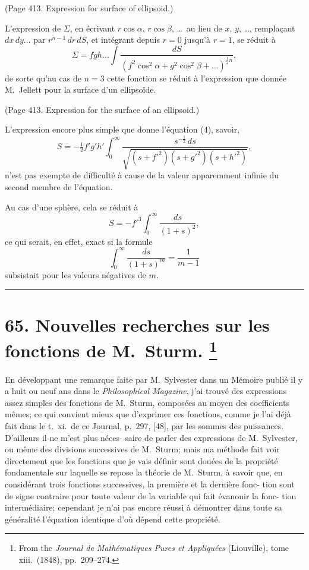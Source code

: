 \documentclass[11pt,a4paper]{book}
\begin{document}
(Page 413. Expression for surface of ellipsoid.)

L'expression de $\Sigma$, en \'{e}crivant $r\cos\alpha$, $r\cos\beta$, \ldots\ au lieu de $x$, $y$, \ldots, rempla\c{c}ant
$dx\,dy\ldots$ par $r^{n-1}\,dr\,dS$, et int\'{e}grant depuis $r = 0$ jusqu'\`{a} $r = 1$, se r\'{e}duit \`{a}
\[
\Sigma = fgh\ldots \int \frac{dS}{(f^2\cos^2\alpha + g^2\cos^2\beta + \ldots)^{\frac{1}{2}n}}, \tag{15}
\]
de sorte qu'au cas de $n = 3$ cette fonction se r\'{e}duit \`{a} l'expression que donn\'{e}e
M.~Jellett pour la surface d'un ellipso\"{i}de.

(Page 413. Expression for the surface of an ellipsoid.)

L'expression encore plus simple que donne l'\'{e}quation (4), savoir,
\[
S = -\tfrac{1}{2}f'g'h' \int_0^\infty \frac{s^{-\frac{1}{2}}\,ds}{\sqrt{(s+f'^2)(s+g'^2)(s+h'^2)}}, \tag{17}
\]
n'est pas exempte de difficult\'{e} \`{a} cause de la valeur apparemment infinie du second
membre de l'\'{e}quation.

Au cas d'une sph\`{e}re, cela se r\'{e}duit \`{a}
\[
S = -f'^3 \int_0^\infty \frac{ds}{(1+s)^2},
\]
ce qui serait, en effet, exact si la formule
\[
\int_0^\infty \frac{ds}{(1+s)^m} = \frac{1}{m-1}
\]
subsistait pour les valeurs n\'{e}gatives de $m$.

\bigskip
\hrule
\bigskip

\newpage
\section[Nouvelles recherches sur les fonctions de M.~Sturm]{%
65. Nouvelles recherches sur les fonctions de M.~Sturm.%
\footnote{From the \textit{Journal de Math\'{e}matiques Pures et Appliqu\'{e}es} (Liouville), tome xiii.\ (1848), pp.~209--274.}}

En d\'{e}veloppant une remarque faite par M.~Sylvester dans un M\'{e}moire publi\'{e} il y
a huit ou neuf ans dans le \textit{Philosophical Magazine}, j'ai trouv\'{e} des expressions assez
simples des fonctions de M.~Sturm, compos\'{e}es au moyen des coefficients m\^{e}mes; ce qui
convient mieux que d'exprimer ces fonctions, comme je l'ai d\'{e}j\`{a} fait dans le t.~xi.\ de
ce Journal, p.~297, [48], par les sommes des puissances. D'ailleurs il ne m'est plus n\'{e}ces-
saire de parler des expressions de M.~Sylvester, ou m\^{e}me des divisions successives de
M.~Sturm; mais ma m\'{e}thode fait voir directement que les fonctions que je vais d\'{e}finir
sont dou\'{e}es de la propri\'{e}t\'{e} fondamentale sur laquelle se repose la th\'{e}orie de M.~Sturm,
\`{a} savoir que, en consid\'{e}rant trois fonctions successives, la premi\`{e}re et la derni\`{e}re fonc-
tion sont de signe contraire pour toute valeur de la variable qui fait \'{e}vanouir la fonc-
tion interm\'{e}diaire; cependant je n'ai pas encore r\'{e}ussi \`{a} d\'{e}montrer dans toute sa
g\'{e}n\'{e}ralit\'{e} l'\'{e}quation identique d'o\`{u} d\'{e}pend cette propri\'{e}t\'{e}.
\end{document}
